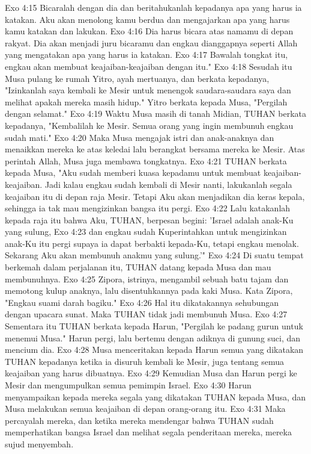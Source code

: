 Exo 4:15  Bicaralah dengan dia dan beritahukanlah kepadanya apa yang harus ia katakan. Aku akan menolong kamu berdua dan mengajarkan apa yang harus kamu katakan dan lakukan.
Exo 4:16  Dia harus bicara atas namamu di depan rakyat. Dia akan menjadi juru bicaramu dan engkau dianggapnya seperti Allah yang mengatakan apa yang harus ia katakan.
Exo 4:17  Bawalah tongkat itu, engkau akan membuat keajaiban-keajaiban dengan itu."
Exo 4:18  Sesudah itu Musa pulang ke rumah Yitro, ayah mertuanya, dan berkata kepadanya, "Izinkanlah saya kembali ke Mesir untuk menengok saudara-saudara saya dan melihat apakah mereka masih hidup." Yitro berkata kepada Musa, "Pergilah dengan selamat."
Exo 4:19  Waktu Musa masih di tanah Midian, TUHAN berkata kepadanya, "Kembalilah ke Mesir. Semua orang yang ingin membunuh engkau sudah mati."
Exo 4:20  Maka Musa mengajak istri dan anak-anaknya dan menaikkan mereka ke atas keledai lalu berangkat bersama mereka ke Mesir. Atas perintah Allah, Musa juga membawa tongkatnya.
Exo 4:21  TUHAN berkata kepada Musa, "Aku sudah memberi kuasa kepadamu untuk membuat keajaiban-keajaiban. Jadi kalau engkau sudah kembali di Mesir nanti, lakukanlah segala keajaiban itu di depan raja Mesir. Tetapi Aku akan menjadikan dia keras kepala, sehingga ia tak mau mengizinkan bangsa itu pergi.
Exo 4:22  Lalu katakanlah kepada raja itu bahwa Aku, TUHAN, berpesan begini: 'Israel adalah anak-Ku yang sulung,
Exo 4:23  dan engkau sudah Kuperintahkan untuk mengizinkan anak-Ku itu pergi supaya ia dapat berbakti kepada-Ku, tetapi engkau menolak. Sekarang Aku akan membunuh anakmu yang sulung.'"
Exo 4:24  Di suatu tempat berkemah dalam perjalanan itu, TUHAN datang kepada Musa dan mau membunuhnya.
Exo 4:25  Zipora, istrinya, mengambil sebuah batu tajam dan memotong kulup anaknya, lalu disentuhkannya pada kaki Musa. Kata Zipora, "Engkau suami darah bagiku."
Exo 4:26  Hal itu dikatakannya sehubungan dengan upacara sunat. Maka TUHAN tidak jadi membunuh Musa.
Exo 4:27  Sementara itu TUHAN berkata kepada Harun, "Pergilah ke padang gurun untuk menemui Musa." Harun pergi, lalu bertemu dengan adiknya di gunung suci, dan mencium dia.
Exo 4:28  Musa menceritakan kepada Harun semua yang dikatakan TUHAN kepadanya ketika ia disuruh kembali ke Mesir, juga tentang semua keajaiban yang harus dibuatnya.
Exo 4:29  Kemudian Musa dan Harun pergi ke Mesir dan mengumpulkan semua pemimpin Israel.
Exo 4:30  Harun menyampaikan kepada mereka segala yang dikatakan TUHAN kepada Musa, dan Musa melakukan semua keajaiban di depan orang-orang itu.
Exo 4:31  Maka percayalah mereka, dan ketika mereka mendengar bahwa TUHAN sudah memperhatikan bangsa Israel dan melihat segala penderitaan mereka, mereka sujud menyembah.
